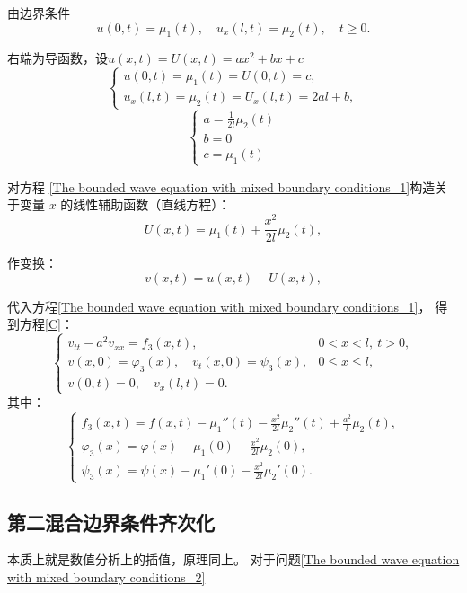\documentclass[12pt,a4paper]{article}
\numberwithin{subsection}{section}   %
\numberwithin{subsubsection}{subsection}
\theoremstyle{plain}
\theoremstyle{definition}
\theoremstyle{remark}
\theoremstyle{remark}
\begin{document}
		由边界条件
	\begin{equation}
		u(0,t) = \mu_1(t), \quad u_x(l,t) = \mu_2(t), \quad t \geq 0.
	\end{equation}
	
	右端为导函数，设$u(x, t)=U(x, t)=ax^2+bx+c$
	\[
	\begin{cases}
		u(0, t) = \mu_1(t) = U(0, t) = c, \\
		u_x(l, t) = \mu_2(t) = U_x(l, t) = 2al + b,
	\end{cases}
	\]
	\[
	\begin{cases}
		a = \frac{1}{2l}\mu_2(t) \\
		b =0 \\
		c = \mu_1(t)
	\end{cases}
	\]
	
	对方程 \eqref{The bounded wave equation with mixed boundary conditions_1}构造关于变量 \(x\) 的线性辅助函数（直线方程）：
	\begin{equation}
		U(x, t) = \mu_1(t) + \frac{x^2}{2l}\mu_2(t) ,
	\end{equation}
	
	作变换：
	\begin{equation}
		v(x, t) = u(x, t) - U(x, t),
	\end{equation}
	
	代入方程\eqref{The bounded wave equation with mixed boundary conditions_1}，
	得到方程\eqref{C}：
	\begin{equation}\label{C}
		\begin{cases}
			v_{tt} - a^2 v_{xx} = f_3(x, t), & 0 < x < l, \ t > 0, \\
			v(x, 0) = \varphi_3(x), \quad v_t(x, 0) = \psi_3(x), & 0 \leq x \leq l, \\
			v(0, t) = 0, \quad v_x(l, t) = 0. &
		\end{cases}
	\end{equation}
	其中：
	\begin{equation}
		\begin{cases}
			f_3(x, t) = f(x, t) - \mu_1''(t) - \frac{x^2}{2l}\mu_2''(t)+\frac{a^2}{l} \mu_2(t)  , \\
			\varphi_3(x) = \varphi(x) - \mu_1(0) - \frac{x^2}{2l}\mu_2(0), \\
			\psi_3(x) = \psi(x) - \mu_1'(0) - \frac{x^2}{2l}\mu_2'(0).
		\end{cases}
	\end{equation}
	
	
		\subsection{第二混合边界条件齐次化}
	本质上就是数值分析上的插值，原理同上。
	对于问题\eqref{The bounded wave equation with mixed boundary conditions_2}
	
\end{document}
